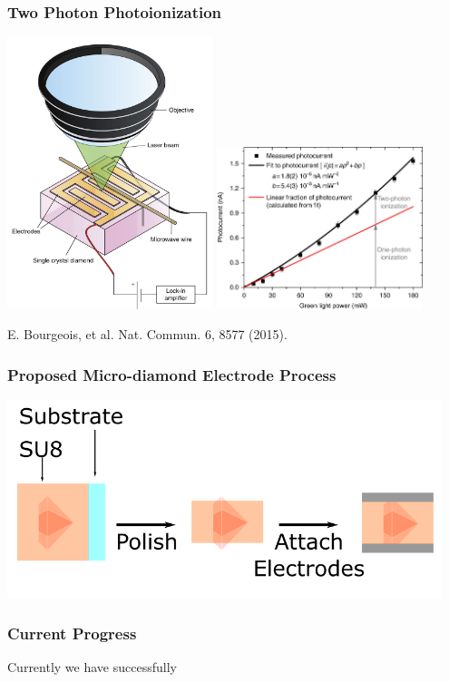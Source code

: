 \documentclass{beamer}
\begin{document}
\begin{frame}\frametitle{Two Photon Photoionization}
    \centering
    \includegraphics[width=0.45\textwidth]{Images/TwoPhotonGroup.png}
    \includegraphics[width=0.45\textwidth]{Images/TwoPhotonPlot.jpg}

    E. Bourgeois, et al. Nat. Commun. 6, 8577 (2015).
\end{frame}

\begin{frame}\frametitle{Proposed Micro-diamond Electrode Process}
    \centering
    \includegraphics[width=0.95\textwidth]{Images/ElectrodeProcess.png}
\end{frame}

\begin{frame}\frametitle{Current Progress}
    Currently we have successfully
\end{frame}
\end{document}
